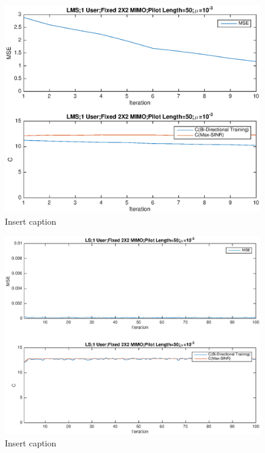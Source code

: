 \documentclass[11pt, oneside]{article}   	%
\begin{document}
\begin{figure}[bp!]
    \centering
    \centerline{\includegraphics[width=220mm]{LMS5}}
    \caption{Insert caption}
\end{figure} 

\begin{figure}[bp!]
    \centering
    \centerline{\includegraphics[width=220mm]{LS1}}
    \caption{Insert caption}
\end{figure} 
\end{document}
